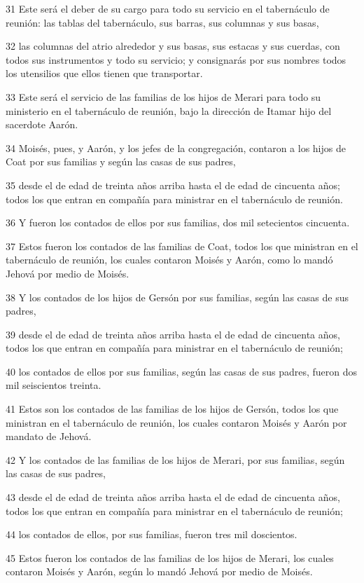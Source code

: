 \par 31 Este será el deber de su cargo para todo su servicio en el tabernáculo de reunión: las tablas del tabernáculo, sus barras, sus columnas y sus basas,
\par 32 las columnas del atrio alrededor y sus basas, sus estacas y sus cuerdas, con todos sus instrumentos y todo su servicio; y consignarás por sus nombres todos los utensilios que ellos tienen que transportar.
\par 33 Este será el servicio de las familias de los hijos de Merari para todo su ministerio en el tabernáculo de reunión, bajo la dirección de Itamar hijo del sacerdote Aarón.
\par 34 Moisés, pues, y Aarón, y los jefes de la congregación, contaron a los hijos de Coat por sus familias y según las casas de sus padres,
\par 35 desde el de edad de treinta años arriba hasta el de edad de cincuenta años; todos los que entran en compañía para ministrar en el tabernáculo de reunión.
\par 36 Y fueron los contados de ellos por sus familias, dos mil setecientos cincuenta.
\par 37 Estos fueron los contados de las familias de Coat, todos los que ministran en el tabernáculo de reunión, los cuales contaron Moisés y Aarón, como lo mandó Jehová por medio de Moisés.
\par 38 Y los contados de los hijos de Gersón por sus familias, según las casas de sus padres,
\par 39 desde el de edad de treinta años arriba hasta el de edad de cincuenta años, todos los que entran en compañía para ministrar en el tabernáculo de reunión;
\par 40 los contados de ellos por sus familias, según las casas de sus padres, fueron dos mil seiscientos treinta.
\par 41 Estos son los contados de las familias de los hijos de Gersón, todos los que ministran en el tabernáculo de reunión, los cuales contaron Moisés y Aarón por mandato de Jehová.
\par 42 Y los contados de las familias de los hijos de Merari, por sus familias, según las casas de sus padres,
\par 43 desde el de edad de treinta años arriba hasta el de edad de cincuenta años, todos los que entran en compañía para ministrar en el tabernáculo de reunión;
\par 44 los contados de ellos, por sus familias, fueron tres mil doscientos.
\par 45 Estos fueron los contados de las familias de los hijos de Merari, los cuales contaron Moisés y Aarón, según lo mandó Jehová por medio de Moisés.
